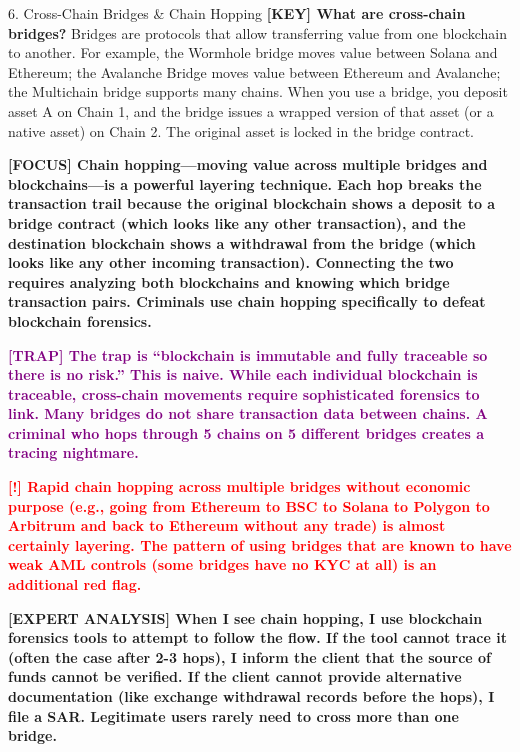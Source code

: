 \documentclass[11pt,a4paper]{beamer}
\newcommand{\redflag}[1]{\textcolor{red}{\textbf{[!] #1}}}
\newcommand{\examfocus}[1]{\textcolor{orange!80!black}{\textbf{[FOCUS] #1}}}
\newcommand{\trap}[1]{\textcolor{purple}{\textbf{[TRAP] #1}}}
\newcommand{\keyterm}[1]{\textcolor{red!80!black}{\textbf{[KEY] #1}}}
\newcommand{\expert}[1]{\textcolor{blue!70!black}{\textbf{[EXPERT ANALYSIS] #1}}}
\begin{document}
	\begin{frame}{6. Cross-Chain Bridges \& Chain Hopping}
		\tiny
		\keyterm{What are cross-chain bridges?} Bridges are protocols that allow transferring value from one blockchain to another. For example, the Wormhole bridge moves value between Solana and Ethereum; the Avalanche Bridge moves value between Ethereum and Avalanche; the Multichain bridge supports many chains. When you use a bridge, you deposit asset A on Chain 1, and the bridge issues a wrapped version of that asset (or a native asset) on Chain 2. The original asset is locked in the bridge contract.
		
		\vspace{0.1cm}
		\examfocus{Chain hopping—moving value across multiple bridges and blockchains—is a powerful layering technique. Each hop breaks the transaction trail because the original blockchain shows a deposit to a bridge contract (which looks like any other transaction), and the destination blockchain shows a withdrawal from the bridge (which looks like any other incoming transaction). Connecting the two requires analyzing both blockchains and knowing which bridge transaction pairs. Criminals use chain hopping specifically to defeat blockchain forensics.}
		
		\vspace{0.1cm}
		\trap{The trap is “blockchain is immutable and fully traceable so there is no risk.” This is naive. While each individual blockchain is traceable, cross-chain movements require sophisticated forensics to link. Many bridges do not share transaction data between chains. A criminal who hops through 5 chains on 5 different bridges creates a tracing nightmare.}
		
		\vspace{0.1cm}
		\redflag{Rapid chain hopping across multiple bridges without economic purpose (e.g., going from Ethereum to BSC to Solana to Polygon to Arbitrum and back to Ethereum without any trade) is almost certainly layering. The pattern of using bridges that are known to have weak AML controls (some bridges have no KYC at all) is an additional red flag.}
		
		\vspace{0.1cm}
		\expert{When I see chain hopping, I use blockchain forensics tools to attempt to follow the flow. If the tool cannot trace it (often the case after 2-3 hops), I inform the client that the source of funds cannot be verified. If the client cannot provide alternative documentation (like exchange withdrawal records before the hops), I file a SAR. Legitimate users rarely need to cross more than one bridge.}
	\end{frame}
	
\end{document}
